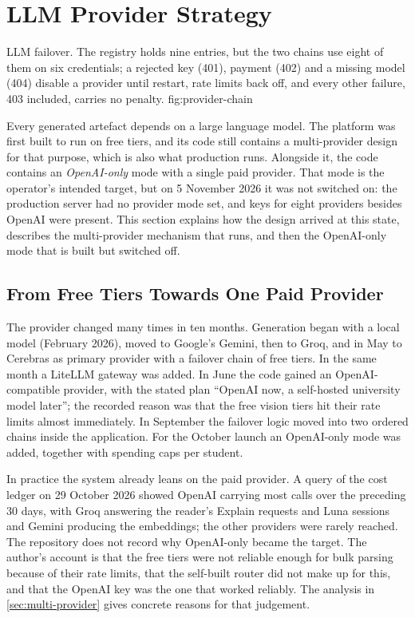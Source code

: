 \section{LLM Provider Strategy}
\label{sec:provider-strategy}

  {LLM failover. The registry holds nine entries, but the two chains use eight
   of them on six credentials; a rejected key (401), payment (402) and a missing
   model (404) disable a provider until restart, rate limits back off, and every
   other failure, 403 included, carries no penalty.}
  {fig:provider-chain}

Every generated artefact depends on a large language model. The platform was
first built to run on free tiers, and its code still contains a multi-provider
design for that purpose, which is also what production runs. Alongside it, the
code contains an \emph{OpenAI-only} mode with a single paid provider. That mode is
the operator's intended target, but on 5 November 2026 it was not switched on:
the production server had no provider mode set, and keys for eight providers
besides OpenAI were present. This section explains how the design arrived at
this state, describes the multi-provider mechanism that runs, and then the
OpenAI-only mode that is built but switched off.

\subsection{From Free Tiers Towards One Paid Provider}
\label{sec:provider-history}

The provider changed many times in ten months. Generation began with a local
model (February 2026), moved to Google's Gemini, then to Groq, and in May to
Cerebras as primary provider with a failover chain of free tiers. In the same
month a LiteLLM gateway was added. In June the code gained an OpenAI-compatible
provider, with the stated plan ``OpenAI now, a self-hosted university model
later''; the recorded reason was that the free vision tiers hit their rate limits
almost immediately. In September the failover logic moved into two ordered
chains inside the application. For the October launch an OpenAI-only mode was
added, together with spending caps per student.

In practice the system already leans on the paid provider. A query of the
cost ledger on 29 October 2026 showed OpenAI carrying most calls over the
preceding 30 days, with Groq answering the reader's Explain requests and Luna
sessions and Gemini producing the embeddings; the other providers were rarely
reached. The repository does not record why OpenAI-only became the target. The
author's account is that the free tiers were not reliable enough for bulk
parsing because of their rate limits, that the self-built router did not make up
for this, and that the OpenAI key was the one that worked reliably. The analysis
in \cref{sec:multi-provider} gives concrete reasons for that judgement.

